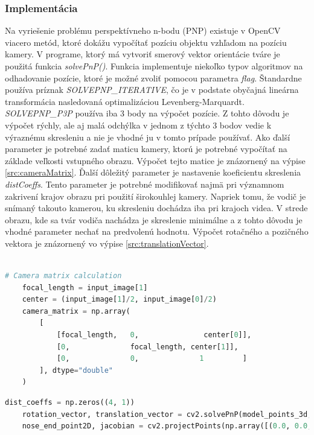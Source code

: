 \documentclass[slovak,master,dept460,male,cpp,cpdeclaration]{diploma}
\begin{document}
\subsubsection*{Implementácia}
Na vyriešenie problému perspektívneho n-bodu (PNP) existuje v OpenCV viacero metód, ktoré dokážu vypočítať  pozíciu objektu vzhľadom na pozíciu kamery. V programe, ktorý má vytvoriť smerový vektor orientácie tváre  je použitá funkcia \textit{solvePnP()}. Funkcia implementuje niekoľko typov algoritmov na odhadovanie pozície, ktoré je možné zvoliť pomocou parametra \textit{flag}. Štandardne používa príznak \textit{SOLVEPNP\_ITERATIVE}, čo je v podstate obyčajná lineárna transformácia nasledovaná optimalizáciou Levenberg-Marquardt. \textit{SOLVEPNP\_P3P} používa iba 3 body na výpočet pozície. Z tohto dôvodu je výpočet rýchly, ale  aj malá odchýlka  v jednom z týchto 3 bodov vedie k výraznému skresleniu a nie je vhodné ju v tomto prípade používať.  Ako ďalší parameter je potrebné  zadať  maticu kamery, ktorú je potrebné vypočítať na základe veľkosti vstupného obrazu. Výpočet tejto matice je znázornený na výpise \ref{src:cameraMatrix}. Ďalší dôležitý parameter je nastavenie koeficientu skreslenia \textit{distCoeffs}. Tento parameter je potrebné modifikovať najmä pri významnom zakrivení krajov obrazu pri použití širokouhlej kamery. Napriek tomu, že vodič je snímaný  takouto kamerou, ku skresleniu dochádza iba pri krajoch videa. V strede obrazu, kde sa tvár vodiča nachádza je skreslenie minimálne a z tohto dôvodu je vhodné parameter nechať na predvolenú hodnotu. Výpočet rotačného a pozičného vektora je znázornený vo výpise \ref{src:translationVector}.
\\\\
\begin{lstlisting}[language=Python,label=src:cameraMatrix,caption={Výpočet  matice kamery}]
    # Camera matrix calculation
    focal_length = input_image[1]
    center = (input_image[1]/2, input_image[0]/2)
    camera_matrix = np.array(
        [
            [focal_length,   0,               center[0]],
            [0,              focal_length, center[1]],
            [0,              0,              1         ]
        ], dtype="double"
    )
\end{lstlisting}

\newpage
\begin{lstlisting}[language=Python,label=src:translationVector,caption={rotačného a pozičného vektora}]
    dist_coeffs = np.zeros((4, 1))
    rotation_vector, translation_vector = cv2.solvePnP(model_points_3d, image_points, camera_matrix, dist_coeffs, flags=cv2.SOLVEPNP_ITERATIVE)
    nose_end_point2D, jacobian = cv2.projectPoints(np.array([(0.0, 0.0, 1000.0)]), rotation_vector, translation_vector, camera_matrix, dist_coeffs)
\end{lstlisting}
\end{document}
